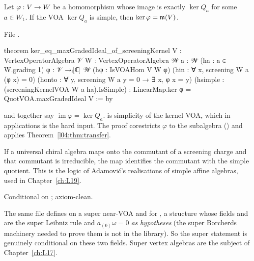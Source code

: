 \begin{theorem}\label{l04:thm:scrtransfer}
Let $\varphi:V\to W$ be a homomorphism whose image is exactly $\ker Q_a$ for some $a\in W_1$.
If the VOA $\ker Q_a$ is simple, then $\ker\varphi = \mathfrak{m}(V)$.
\end{theorem}
\noindent File .
\begin{leancode}
theorem ker_eq_maxGradedIdeal_of_screeningKernel {V : VertexOperatorAlgebra 𝒱}
    {W : VertexOperatorAlgebra 𝒲} {a : 𝒲} (ha : a ∈ W.grading 1) {φ : 𝒱 →ₗ[ℂ] 𝒲}
    (hφ : IsVOAHom V W φ) (hin : ∀ x, screening W a (φ x) = 0)
    (honto : ∀ y, screening W a y = 0 → ∃ x, φ x = y)
    (hsimple : (screeningKernelVOA W a ha).IsSimple) :
    LinearMap.ker φ = QuotVOA.maxGradedIdeal V := by
\end{leancode}
\begin{dictionary}
 and  together say $\operatorname{im}\varphi = \ker Q_a$.  is
simplicity of the kernel VOA, which in applications is the hard input. The proof corestricts
$\varphi$ to the subalgebra (\allowbreak{}) and applies Theorem~\ref{l04:thm:transfer}.
\end{dictionary}
\begin{physics}
If a universal chiral algebra maps onto the commutant of a screening charge and that commutant is
irreducible, the map identifies the commutant with the simple quotient. This is the logic of
Adamovi\'c's realisations of simple affine algebras, used in Chapter~\ref{ch:L19}.
\end{physics}
\begin{status}
Conditional on ; axiom-clean.
\end{status}

\begin{remark}\label{l04:rem:super}
The same file defines  on a super near-VOA and
 for , a structure whose fields
 and  are the super Leibniz rule and $a_{(0)}\omega = 0$ \emph{as
hypotheses} (the super Borcherds machinery needed to prove them is not in the library). So the super
statement is genuinely conditional on these two fields. Super vertex algebras are the subject of
Chapter~\ref{ch:L17}.
\end{remark}

